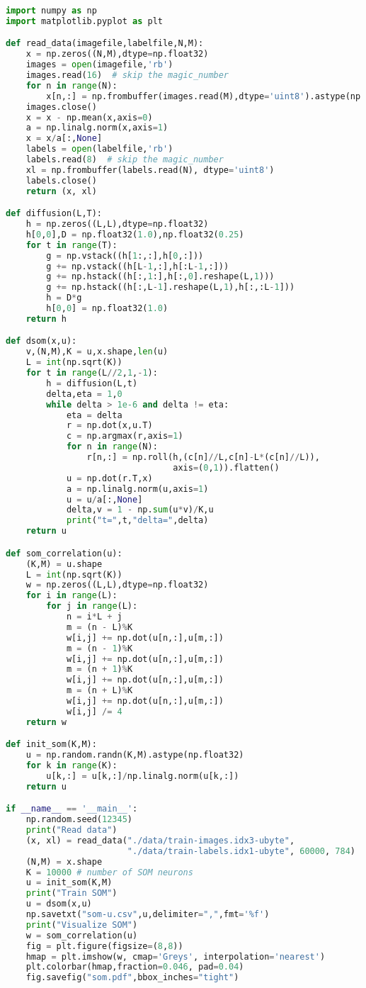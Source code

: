 \documentclass[10pt,english]{article}
\begin{document}
\footnotesize
\begin{lstlisting}[language=Python]
import numpy as np
import matplotlib.pyplot as plt

def read_data(imagefile,labelfile,N,M):
    x = np.zeros((N,M),dtype=np.float32)
    images = open(imagefile,'rb')
    images.read(16)  # skip the magic_number
    for n in range(N):
        x[n,:] = np.frombuffer(images.read(M),dtype='uint8').astype(np.float32)
    images.close()
    x = x - np.mean(x,axis=0)
    a = np.linalg.norm(x,axis=1)
    x = x/a[:,None]
    labels = open(labelfile,'rb')
    labels.read(8)  # skip the magic_number
    xl = np.frombuffer(labels.read(N), dtype='uint8')
    labels.close()
    return (x, xl)

def diffusion(L,T):
    h = np.zeros((L,L),dtype=np.float32)
    h[0,0],D = np.float32(1.0),np.float32(0.25)
    for t in range(T):
        g = np.vstack((h[1:,:],h[0,:]))
        g += np.vstack((h[L-1,:],h[:L-1,:]))
        g += np.hstack((h[:,1:],h[:,0].reshape(L,1)))
        g += np.hstack((h[:,L-1].reshape(L,1),h[:,:L-1]))
        h = D*g
        h[0,0] = np.float32(1.0)
    return h

def dsom(x,u):
    v,(N,M),K = u,x.shape,len(u)
    L = int(np.sqrt(K))
    for t in range(L//2,1,-1):
        h = diffusion(L,t)
        delta,eta = 1,0
        while delta > 1e-6 and delta != eta:
            eta = delta
            r = np.dot(x,u.T)
            c = np.argmax(r,axis=1)
            for n in range(N):
                r[n,:] = np.roll(h,(c[n]//L,c[n]-L*(c[n]//L)),
                                 axis=(0,1)).flatten()
            u = np.dot(r.T,x)
            a = np.linalg.norm(u,axis=1)
            u = u/a[:,None]
            delta,v = 1 - np.sum(u*v)/K,u
            print("t=",t,"delta=",delta)
    return u

def som_correlation(u):
    (K,M) = u.shape
    L = int(np.sqrt(K))
    w = np.zeros((L,L),dtype=np.float32)
    for i in range(L):
        for j in range(L):
            n = i*L + j
            m = (n - L)%K
            w[i,j] += np.dot(u[n,:],u[m,:])
            m = (n - 1)%K
            w[i,j] += np.dot(u[n,:],u[m,:])
            m = (n + 1)%K
            w[i,j] += np.dot(u[n,:],u[m,:])
            m = (n + L)%K
            w[i,j] += np.dot(u[n,:],u[m,:])
            w[i,j] /= 4
    return w

def init_som(K,M):
    u = np.random.randn(K,M).astype(np.float32)
    for k in range(K):
        u[k,:] = u[k,:]/np.linalg.norm(u[k,:])
    return u

if __name__ == '__main__':
    np.random.seed(12345)
    print("Read data")
    (x, xl) = read_data("./data/train-images.idx3-ubyte", 
                        "./data/train-labels.idx1-ubyte", 60000, 784)
    (N,M) = x.shape
    K = 10000 # number of SOM neurons
    u = init_som(K,M)
    print("Train SOM")
    u = dsom(x,u)
    np.savetxt("som-u.csv",u,delimiter=",",fmt='%f')
    print("Visualize SOM")
    w = som_correlation(u)
    fig = plt.figure(figsize=(8,8))
    hmap = plt.imshow(w, cmap='Greys', interpolation='nearest')
    plt.colorbar(hmap,fraction=0.046, pad=0.04)
    fig.savefig("som.pdf",bbox_inches="tight")
\end{lstlisting}
\normalsize
\end{document}
